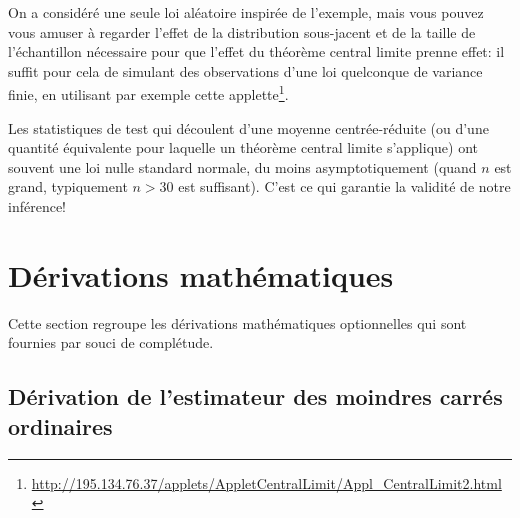 \documentclass[
  11pt,
  letterpaper,
]{article}
\renewcommand{\href}[2]{#2\footnote{\url{#1}}}
\theoremstyle{definition}
\theoremstyle{definition}
\theoremstyle{definition}
\theoremstyle{definition}
\theoremstyle{remark}
\begin{document}
On a considéré une seule loi aléatoire inspirée de l'exemple, mais vous pouvez vous amuser à regarder l'effet de la distribution sous-jacent et de la taille de l'échantillon nécessaire pour que l'effet du théorème central limite prenne effet: il suffit pour cela de simulant des observations d'une loi quelconque de variance finie, en utilisant par exemple cette \href{http://195.134.76.37/applets/AppletCentralLimit/Appl_CentralLimit2.html}{applette}.

Les statistiques de test qui découlent d'une moyenne centrée-réduite (ou d'une quantité équivalente pour laquelle un théorème central limite s'applique) ont souvent une loi nulle standard normale, du moins asymptotiquement (quand \(n\) est grand, typiquement \(n>30\) est suffisant). C'est ce qui garantie la validité de notre inférence!

\hypertarget{math}{%
\section{Dérivations mathématiques}\label{math}}

Cette section regroupe les dérivations mathématiques optionnelles qui sont fournies par souci de complétude.

\hypertarget{ols}{%
\subsection{Dérivation de l'estimateur des moindres carrés ordinaires}\label{ols}}
\end{document}
